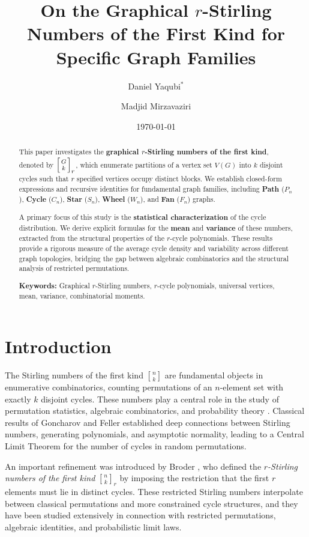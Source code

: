 \documentclass{amsart}
\author{Daniel Yaqubi$^{*}$}
\author{Madjid Mirzavaziri}
\title{On the Graphical $r$-Stirling Numbers of the First Kind for Specific Graph Families}
\date{\today}
\newcommand{\str}[2]{\left[ \genfrac{}{}{0pt}{}{#1}{#2} \right]_r}
\theoremstyle{definition}
\begin{document}
\maketitle

\begin{abstract}
This paper investigates the \textbf{graphical $r$-Stirling numbers of the first kind}, denoted by $\str{G}{k}$, which enumerate partitions of a vertex set $V(G)$ into $k$ disjoint cycles such that $r$ specified vertices occupy distinct blocks. We establish closed-form expressions and recursive identities for fundamental graph families, including \textbf{Path} ($P_n$), \textbf{Cycle} ($C_n$), \textbf{Star} ($S_n$), \textbf{Wheel} ($W_n$), and \textbf{Fan} ($F_n$) graphs. 

A primary focus of this study is the \textbf{statistical characterization} of the cycle distribution. We derive explicit formulas for the \textbf{mean} and \textbf{variance} of these numbers, extracted from the structural properties of the $r$-cycle polynomials. These results provide a rigorous measure of the average cycle density and variability across different graph topologies, bridging the gap between algebraic combinatorics and the structural analysis of restricted permutations.

\medskip
\noindent \textbf{Keywords:} Graphical $r$-Stirling numbers, $r$-cycle polynomials, universal vertices, mean, variance, combinatorial moments.
\end{abstract}
\section{Introduction}

The Stirling numbers of the first kind ${n \brack k}$ are fundamental objects in
enumerative combinatorics, counting permutations of an $n$-element set with
exactly $k$ disjoint cycles. These numbers play a central role in the study of
permutation statistics, algebraic combinatorics, and probability theory
\cite{Goncharov1944,Feller1968}. Classical results of Goncharov and Feller
established deep connections between Stirling numbers, generating polynomials,
and asymptotic normality, leading to a Central Limit Theorem for the number of
cycles in random permutations.

An important refinement was introduced by Broder \cite{Broder1984}, who defined
the \emph{$r$-Stirling numbers of the first kind} ${n \brack k}_r$ by imposing the
restriction that the first $r$ elements must lie in distinct cycles. These
restricted Stirling numbers interpolate between classical permutations and more
constrained cycle structures, and they have been studied extensively in
connection with restricted permutations, algebraic identities, and probabilistic
limit laws.
\end{document}
